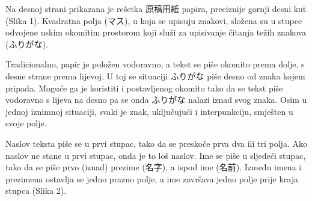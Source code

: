 
\author{Tomislav Mamić}


	

	Na desnoj strani prikazana je rešetka 原稿用紙 papira, preciznije gornji desni kut (Slika 1). Kvadratna polja (マス), u koja se upisuju znakovi, složena su u stupce odvojene uskim okomitim prostorom koji služi za upisivanje čitanja težih znakova (ふりがな).
	
	Tradicionalno, papir je položen vodoravno, a tekst se piše okomito prema dolje, s desne strane prema lijevoj. U toj se situaciji ふりがな piše desno od znaka kojem pripada. Moguće ga je koristiti i postavljenog okomito tako da se tekst piše vodoravno s lijeva na desno pa se onda ふりがな nalazi iznad svog znaka. Osim u jednoj iznimnoj situaciji, svaki je znak, uključujući i interpunkciju, smješten u svoje polje.
	

	Naslov teksta piše se u prvi stupac, tako da se preskoče prva dva ili tri polja. Ako naslov ne stane u prvi stupac, onda je to loš naslov. Ime se piše u sljedeći stupac, tako da se piše prvo (iznad) prezime (名字), a ispod ime (名前). Između imena i prezimena ostavlja se jedno prazno polje, a ime završava jedno polje prije kraja stupca (Slika 2).
	
